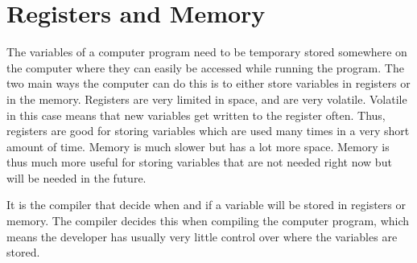  

\section{Registers and Memory}
\label{sec:regmem}
 

The variables of a computer program need to be temporary stored somewhere on the computer where they can easily be accessed while running the program.
The two main ways the computer can do this is to either store variables in registers or in the memory.
Registers are very limited in space, and are very volatile.
Volatile in this case means that new variables get written to the register often.
Thus, registers are good for storing variables which are used many times in a very short amount of time.
Memory is much slower but has a lot more space.
Memory is thus much more useful for storing variables that are not needed right now but will be needed in the future.


It is the compiler that decide when and if a variable will be stored in registers or memory.
The compiler decides this when compiling the computer program, which means the developer has usually very little control over where the variables are stored.


